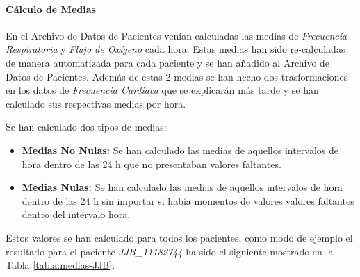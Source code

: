 \paragraph{Cálculo de Medias}

En el Archivo de Datos de Pacientes venían calculadas las medias de \textit{Frecuencia Respiratoria} y \textit{Flujo de Oxígeno} cada hora. Estas medias han sido re-calculadas de manera automatizada para cada paciente y se han añadido al Archivo de Datos de Pacientes. Además de estas 2 medias se han hecho dos trasformaciones en los datos de \textit{Frecuencia Cardiaca} que se explicarán más tarde y se han calculado sus respectivas medias por hora. 

Se han calculado dos tipos de medias: 

\begin{itemize}
    \item \textbf{Medias No Nulas:} Se han calculado las medias de aquellos intervalos de hora dentro de las 24 h que no presentaban valores faltantes.
    \item \textbf{Medias Nulas:} Se han calculado las medias de aquellos intervalos de hora dentro de las 24 h sin importar si había momentos de valores valores faltantes dentro del intervalo hora.
\end{itemize}

Estos valores se han calculado para todos los pacientes, como modo de ejemplo el resultado para el paciente \textit{JJB\_11182744} ha sido el siguiente mostrado en la Tabla \ref{tabla:medias-JJB}:

\newpage
\thispagestyle{empty}

